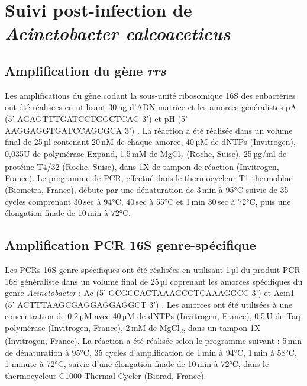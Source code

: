 \section{Suivi post-infection de \textit{Acinetobacter calcoaceticus}}

\subsection{Amplification du gène \textit{rrs}}

Les amplifications du gène codant la sous-unité ribosomique 16S des eubactéries ont été réalisées en utilisant 30\,ng d'ADN matrice et les amorces généralistes pA (5' AGAGTTTGATCCTGGCTCAG 3') et pH (5' AAGGAGGTGATCCAGCGCA 3') \cite{edwards1989}.
La réaction a été réalisée dans un volume final de 25\,µl contenant 20\,nM de chaque amorce, 40\,µM de dNTPs (Invitrogen), 0,035U de polymérase Expand, 1.5\,mM de MgCl\textsubscript{2} (Roche, Suise), 25\,µg/ml de protéine T4/32 (Roche, Suise), dans 1X de tampon de réaction (Invitrogen, France).
Le programme de PCR, effectué dans le thermocycleur T1-thermobloc (Biometra, France), débute par une dénaturation de 3\,min à 95°C suivie de 35 cycles comprenant 30\,sec à 94°C, 40\,sec à 55°C et 1\,min 30\,sec à 72°C, puis une élongation finale de 10\,min à 72°C.

\subsection{Amplification PCR 16S genre-spécifique}

Les PCRs 16S genre-spécifiques ont été réalisées en utilisant 1\,µl du produit PCR 16S généraliste dans un volume final de 25\,µl coprenant les amorces spécifiques du genre \textit{Acinetobacter} : Ac (5' GCGCCACTAAAGCCTCAAAGGCC 3') \cite{kenzaka1998} et Acin1 (5' ACTTTAAGCGAGGAGGAGGCT 3') \cite{sanguin2006}.
Les amorces ont été utilisées à une concentration de 0,2\,µM avec 40\,µM de dNTPs (Invitrogen, France), 0,5\,U de Taq polymérase (Invitrogen, France), 2\,mM de MgCl\textsubscript{2}, dans un tampon 1X (Invitrogen, France).
La réaction a été réalisée selon le programme suivant : 5\,min de dénaturation à 95°C, 35 cycles d'amplification de 1\,min à 94°C, 1\,min à 58°C, 1 minute à 72°C, suivie d'une élongation finale de 10\,min à 72°C, dans le thermocycleur C1000 Thermal Cycler (Biorad, France).